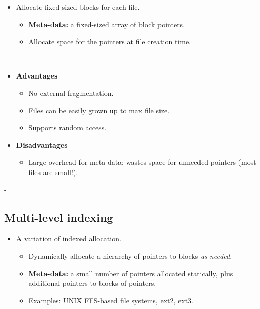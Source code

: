 \documentclass[11pt,a4paper]{article}
\makeatletter
\newcommand{\keepspace}[1]{\par\penalty-100\begingroup
  \setlength{\dimen@}{#1}\dimen@ii\pagegoal\advance\dimen@ii-\pagetotal
  \ifdim\dimen@>\dimen@ii\ifdim\dimen@ii>\z@\vfil\fi\break\fi\endgroup}
\newcommand{\allocstrip}[2]{%
  \foreach \l [count=\i from 0] in {#1} {
    \node[ablk, f\l] (s\i) at (\i*0.74, #2) {\l};
  }
}
\newcommand{\stripindex}[2]{%
  \pgfmathtruncatemacro{\last}{#1-1}
  \foreach \i in {0,...,\last} {
    \node[font=\scriptsize, text=g3] at (\i*0.74, #2) {\i};
  }
}
\makeatother
\begin{document}
\begin{itemize}
  \item Allocate fixed-sized blocks for each file.
  \begin{itemize}
    \item \textbf{Meta-data:} a fixed-sized array of block pointers.
    \item Allocate space for the pointers at file creation time.
  \end{itemize}
\end{itemize}

\begin{center}

\end{center}

\keepspace{9\baselineskip}
\begin{itemize}
  \item \textbf{Advantages}
  \begin{itemize}
    \item No external fragmentation.
    \item Files can be easily grown up to max file size.
    \item Supports random access.
  \end{itemize}
  \item \textbf{Disadvantages}
  \begin{itemize}
    \item Large overhead for meta-data: wastes space for unneeded pointers
          (most files are small!).
  \end{itemize}
\end{itemize}

\keepspace{8\baselineskip}
\subsection{Multi-level indexing}\label{sec:multilevel}

\begin{itemize}
  \item A variation of indexed allocation.
  \begin{itemize}
    \item Dynamically allocate a hierarchy of pointers to blocks \emph{as
          needed}.
    \item \textbf{Meta-data:} a small number of pointers allocated
          statically, plus additional pointers to blocks of pointers.
    \item Examples: UNIX FFS-based file systems, ext2, ext3.
  \end{itemize}
\end{itemize}
\end{document}
